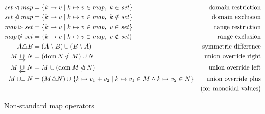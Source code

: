 \begin{figure}[htb]
  \begin{align*}
    \mathit{set} \lhd \mathit{map}
    & = \{ k \mapsto v \mid k \mapsto v \in \mathit{map}, ~ k \in \mathit{set} \}
    & \text{domain restriction}
    \\
    \mathit{set} \mathbin{\slashed{\lhd}} \mathit{map}
    & = \{ k \mapsto v \mid k \mapsto v \in \mathit{map}, ~ k \notin \mathit{set} \}
    & \text{domain exclusion}
    \\
    \mathit{map} \rhd \mathit{set}
    & = \{ k \mapsto v \mid k \mapsto v \in \mathit{map}, ~ v \in \mathit{set} \}
    & \text{range restriction}
    \\
    \mathit{map} \mathbin{\slashed{\rhd}} \mathit{set}
    & = \{ k \mapsto v \mid k \mapsto v \in \mathit{map}, ~ v \notin \mathit{set} \}
    & \text{range exclusion}
    \\
    A \triangle B
    & = (A \setminus B) \cup (B \setminus A)
    & \text{symmetric difference}
    \\
    M \mathbin{\underrightarrow\cup} N
    & = (\operatorname{dom} N \mathbin{\slashed{\lhd}} M)\cup N
    & \text{union override right}
    \\
    M \mathbin{\underleftarrow\cup} N
    & = M \cup (\operatorname{dom} M \mathbin{\slashed{\lhd}} N)
    & \text{union override left}
    \\
    M \mathbin{\cup_{+}} N
    & = (M \triangle N)
    \cup \{k\mapsto v_1+v_2\mid {k\mapsto v_1}\in M \land {k\mapsto v_2}\in N \}
    & \text{union override plus} \\
    & & \text{(for monoidal values)}\\
  \end{align*}
  \caption{Non-standard map operators}
  \label{fig:notation:nonstandard}
\end{figure}

\clearpage
